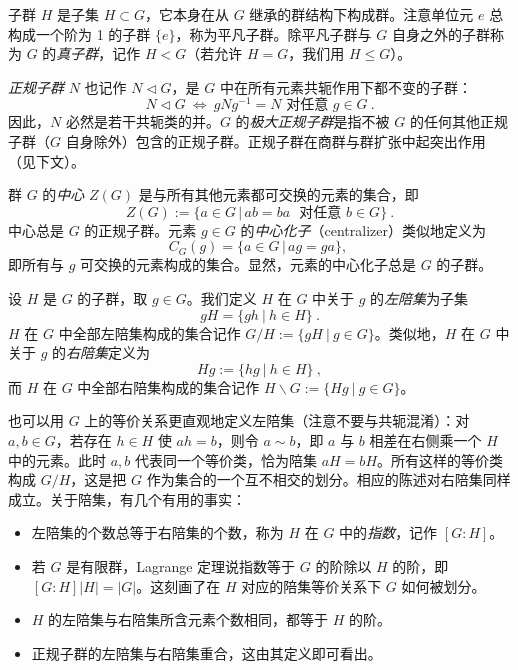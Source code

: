 子群 $H$ 是子集 $H\subset G$，它本身在从 $G$ 继承的群结构下构成群。注意单位元 $e$ 总构成一个阶为 1 的子群 $\lbrace e\rbrace$，称为平凡子群。除平凡子群与 $G$ 自身之外的子群称为 $G$ 的\emph{真子群}，记作 $H<G$（若允许 $H=G$，我们用 $H\leq G$）。

\emph{正规子群} $N$ 也记作 $N\triangleleft G$，是 $G$ 中在所有元素共轭作用下都不变的子群：
\begin{equation}
N\triangleleft G~\Leftrightarrow~gNg^{-1}=N\text{ 对任意 }g\in G~.
\end{equation}
因此，$N$ 必然是若干共轭类的并。$G$ 的\emph{极大正规子群}是指不被 $G$ 的任何其他正规子群（$G$ 自身除外）包含的正规子群。正规子群在商群与群扩张中起突出作用（见下文）。

群 $G$ 的\emph{中心} $Z(G)$ 是与所有其他元素都可交换的元素的集合，即
\begin{equation}
Z(G):=\lbrace a\in G\,\lvert\, ab=ba\text{~~对任意 } b\in G\rbrace~.
\end{equation}
中心总是 $G$ 的正规子群。元素 $g\in G$ 的\emph{中心化子}（centralizer）类似地定义为
\begin{equation}
C_G(g)=\lbrace a\in G\,\lvert\, ag=ga\rbrace,~
\end{equation}
即所有与 $g$ 可交换的元素构成的集合。显然，元素的中心化子总是 $G$ 的子群。

设 $H$ 是 $G$ 的子群，取 $g\in G$。我们定义 $H$ 在 $G$ 中关于 $g$ 的\emph{左陪集}为子集
\begin{equation}
gH=\lbrace gh~|~h\in H\rbrace~.
\end{equation}
$H$ 在 $G$ 中全部左陪集构成的集合记作 $G/H:=\lbrace gH~|~g\in G\rbrace$。类似地，$H$ 在 $G$ 中关于 $g$ 的\emph{右陪集}定义为
\begin{equation}
Hg:=\lbrace hg~|~h\in H\rbrace~,
\end{equation}
而 $H$ 在 $G$ 中全部右陪集构成的集合记作 $H\backslash G:=\lbrace Hg~|~g\in G\rbrace$。

也可以用 $G$ 上的等价关系更直观地定义左陪集（注意不要与共轭混淆）：对 $a,b\in G$，若存在 $h\in H$ 使 $ah=b$，则令 $a\sim b$，即 $a$ 与 $b$ 相差在右侧乘一个 $H$ 中的元素。此时 $a,b$ 代表同一个等价类，恰为陪集 $aH=bH$。所有这样的等价类构成 $G/H$，这是把 $G$ 作为集合的一个互不相交的划分。相应的陈述对右陪集同样成立。关于陪集，有几个有用的事实：
\begin{itemize}
\item 左陪集的个数总等于右陪集的个数，称为 $H$ 在 $G$ 中的\emph{指数}，记作 $[G:H]$。
\item 若 $G$ 是有限群，Lagrange 定理说指数等于 $G$ 的阶除以 $H$ 的阶，即 $[G:H]{|H|}={|G|}$。这刻画了在 $H$ 对应的陪集等价关系下 $G$ 如何被划分。
\item $H$ 的左陪集与右陪集所含元素个数相同，都等于 $H$ 的阶。
\item 正规子群的左陪集与右陪集重合，这由其定义即可看出。
\end{itemize}

